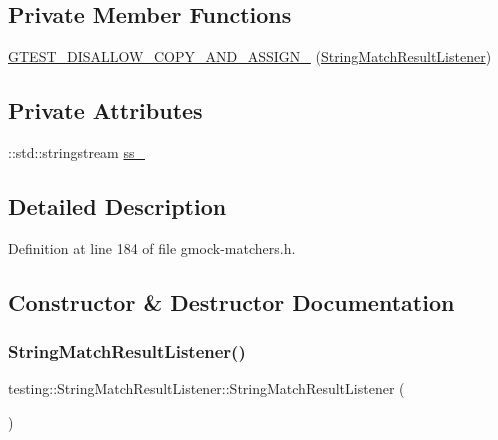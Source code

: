 \subsection*{Private Member Functions}
\begin{DoxyCompactItemize}
\item 
\hyperlink{classtesting_1_1StringMatchResultListener_ab473316f1d511e822ec3051c83b8ed5d}{G\+T\+E\+S\+T\+\_\+\+D\+I\+S\+A\+L\+L\+O\+W\+\_\+\+C\+O\+P\+Y\+\_\+\+A\+N\+D\+\_\+\+A\+S\+S\+I\+G\+N\+\_\+} (\hyperlink{classtesting_1_1StringMatchResultListener}{String\+Match\+Result\+Listener})
\end{DoxyCompactItemize}
\subsection*{Private Attributes}
\begin{DoxyCompactItemize}
\item 
\+::std\+::stringstream \hyperlink{classtesting_1_1StringMatchResultListener_a91649df8349c441ce8963271d0633f3e}{ss\+\_\+}
\end{DoxyCompactItemize}


\subsection{Detailed Description}


Definition at line 184 of file gmock-\/matchers.\+h.



\subsection{Constructor \& Destructor Documentation}
\mbox{\label{classtesting_1_1StringMatchResultListener_a3894c8adca960a2f20a3db6a02b09238}} 
\subsubsection{\texorpdfstring{String\+Match\+Result\+Listener()}{StringMatchResultListener()}}
{\footnotesize\ttfamily testing\+::\+String\+Match\+Result\+Listener\+::\+String\+Match\+Result\+Listener (\begin{DoxyParamCaption}{ }\end{DoxyParamCaption})\hspace{0.3cm}{\ttfamily [inline]}}



